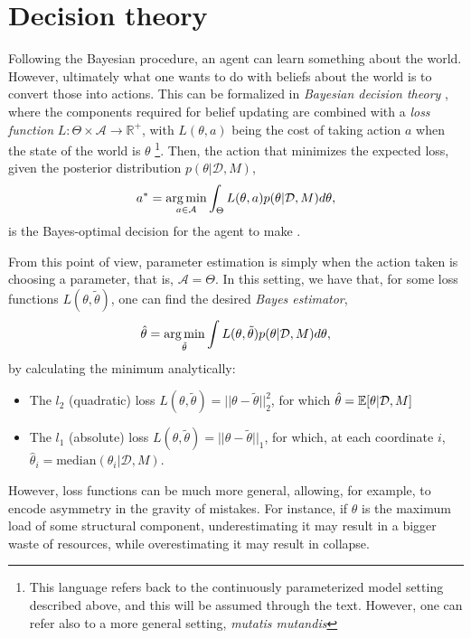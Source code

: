 \section{Decision theory}\label{decision_theory_section}
Following the Bayesian procedure, an agent can learn something about the world. However, ultimately what one wants to do with beliefs about the world is to convert those into actions. This can be formalized in \textit{Bayesian decision theory} \cite{Robert_2001}, where the components required for belief updating are combined with a \textit{loss function} $L : \Theta \times \mathcal{A} \to \mathbb{R}^+$, 
with $L(\theta,a)$ being the cost of taking action $a$ when the state of the world is $\theta$ \footnote{This language refers back to the continuously parameterized model setting described above, and this will be assumed through the text. However, one can refer also to a more general setting, \textit{mutatis mutandis}}. Then, the action that minimizes the expected loss, given the posterior distribution $p(\theta|\mathcal{D},M)$, 
\begin{equation}\label{generalloss}
 a^* = \operatorname*{arg\,min}_{a \in \mathcal{A}} \int_\Theta L(\theta,a) p(\theta|\mathcal{D},M) d \theta,
\end{equation}
is the Bayes-optimal decision for the agent to make \cite{Robert_2001}.

From this point of view, parameter estimation is simply when the action taken is choosing a parameter, that is, $\mathcal{A} = \Theta$. In this setting, we have that, for some loss functions $L(\theta,\tilde{\theta})$, one can find the desired \textit{Bayes estimator},
\begin{equation}
\hat{\theta} = \operatorname*{arg\,min}_{\tilde{\theta}} \int L(\theta,\tilde{\theta}) p(\theta|\mathcal{D},M) d \theta,
\end{equation}
by calculating the minimum analytically:
\begin{itemize}
	\item The $l_2$ (quadratic) loss $L(\theta,\tilde{\theta}) = ||\theta - \tilde{\theta}||_2^2$, for which $\hat{\theta} = {\mathbb E}[\theta|\mathcal{D},M]$
	\item The $l_1$ (absolute) loss $L(\theta,\tilde{\theta}) = ||\theta - \tilde{\theta}||_1$, for which, at each coordinate $i$, $\hat{\theta}_i = \text{median}(\theta_i|\mathcal{D},M)$.
\end{itemize}

However, loss functions can be much more general, allowing, for example, to encode asymmetry in the gravity of mistakes. For instance, if $\theta$ is the maximum load of some structural component, underestimating it may result in a bigger waste of resources, while overestimating it may result in collapse.

